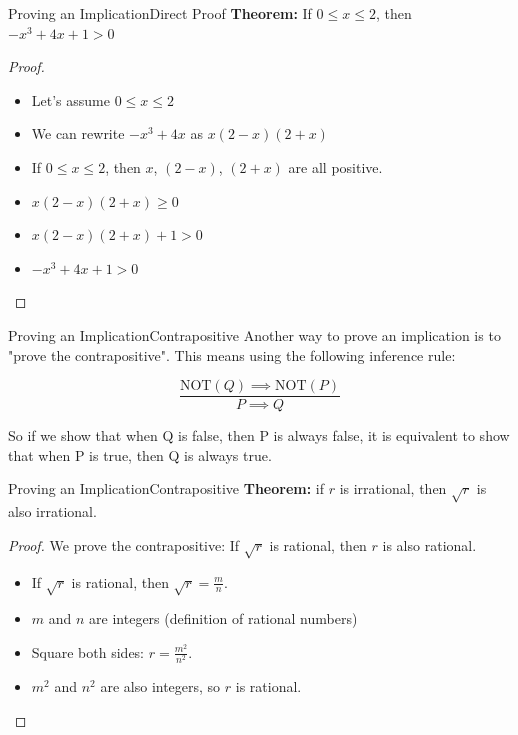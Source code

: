 \begin{frame}{Proving an Implication}{Direct Proof}
{\bf Theorem:} If $0 \leq x \leq 2$, then $-x^3 + 4x + 1 > 0$\bigskip

\begin{proof}
\begin{itemize}
  \item Let's assume $0 \leq x \leq 2$
  \item We can rewrite $-x^3 + 4x$ as $x(2-x)(2+x)$
  \item If $0 \leq x \leq 2$, then $x$, $(2-x)$, $(2+x)$ are all positive.
  \item $x(2-x)(2+x) \geq 0$
  \item $x(2-x)(2+x) + 1 > 0$
  \item $-x^3 + 4x + 1 > 0$
\end{itemize}
\end{proof}

\end{frame}

\begin{frame}{Proving an Implication}{Contrapositive}
  Another way to prove an implication is to "prove the contrapositive". This means using the following inference rule:

  \[
    \frac{\text{NOT}(Q) \implies \text{NOT}(P)}{P \implies Q}
  \]

  So if we show that when Q is false, then P is always false, it is equivalent to show that when P is true, then Q is always true.
\end{frame}

\begin{frame}{Proving an Implication}{Contrapositive}
  {\bf Theorem:} if $r$ is irrational, then $\sqrt{r}$ is also irrational.

  \begin{proof}
    We prove the contrapositive: If $\sqrt{r}$ is rational, then $r$ is also rational.
    \begin{itemize}
      \item If $\sqrt{r}$ is rational, then $\sqrt{r}=\frac{m}{n}$.
      \item $m$ and $n$ are integers (definition of rational numbers)
      \item Square both sides: $r = \frac{m^2}{n^2}$.
      \item $m^2$ and $n^2$ are also integers, so $r$ is rational.
    \end{itemize}
  \end{proof}
\end{frame}



